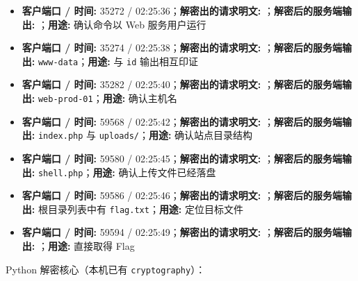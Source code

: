 \begin{itemize}
\tightlist
\item
  \textbf{客户端口 / 时间:} 35272 / 02:25:36；\textbf{解密出的请求明文:} \texttt{}；\textbf{解密后的服务端输出:} \texttt{}；\textbf{用途:} 确认命令以 Web 服务用户运行
\item
  \textbf{客户端口 / 时间:} 35274 / 02:25:38；\textbf{解密出的请求明文:} \texttt{}；\textbf{解密后的服务端输出:} \texttt{www-data}；\textbf{用途:} 与 \texttt{id} 输出相互印证
\item
  \textbf{客户端口 / 时间:} 35282 / 02:25:40；\textbf{解密出的请求明文:} \texttt{}；\textbf{解密后的服务端输出:} \texttt{web-prod-01}；\textbf{用途:} 确认主机名
\item
  \textbf{客户端口 / 时间:} 59568 / 02:25:42；\textbf{解密出的请求明文:} \texttt{}；\textbf{解密后的服务端输出:} \texttt{index.php} 与 \texttt{uploads/}；\textbf{用途:} 确认站点目录结构
\item
  \textbf{客户端口 / 时间:} 59580 / 02:25:45；\textbf{解密出的请求明文:} \texttt{}；\textbf{解密后的服务端输出:} \texttt{shell.php}；\textbf{用途:} 确认上传文件已经落盘
\item
  \textbf{客户端口 / 时间:} 59586 / 02:25:46；\textbf{解密出的请求明文:} \texttt{}；\textbf{解密后的服务端输出:} 根目录列表中有 \texttt{flag.txt}；\textbf{用途:} 定位目标文件
\item
  \textbf{客户端口 / 时间:} 59594 / 02:25:49；\textbf{解密出的请求明文:} \texttt{}；\textbf{解密后的服务端输出:} \texttt{}；\textbf{用途:} 直接取得 Flag
\end{itemize}

Python 解密核心（本机已有 \texttt{cryptography}）：


